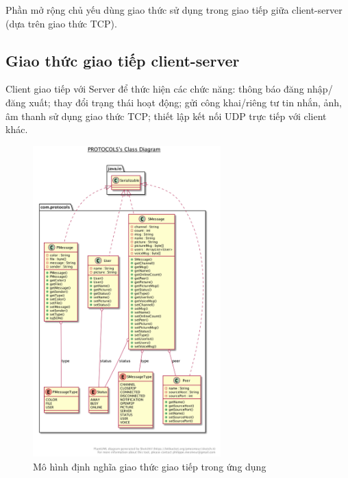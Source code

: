 \documentclass[a4paper]{article}
\begin{document}
Phần mở rộng chủ yếu dùng giao thức sử dụng trong giao tiếp giữa client-server (dựa trên giao thức TCP).

\subsection{Giao thức giao tiếp client-server}
Client giao tiếp với Server để thức hiện các chức năng: thông báo đăng nhập/đăng xuất; thay đổi trạng thái hoạt động; gửi công khai/riêng tư tin nhắn, ảnh, âm thanh sử dụng giao thức TCP; thiết lập kết nối UDP trực tiếp với client khác.
\newpage
\begin{figure}[h!]
	\centering
	\includegraphics[height=12cm]{protocols}
	\caption{Mô hình định nghĩa giao thức giao tiếp trong ứng dụng}
\end{figure}
\end{document}
